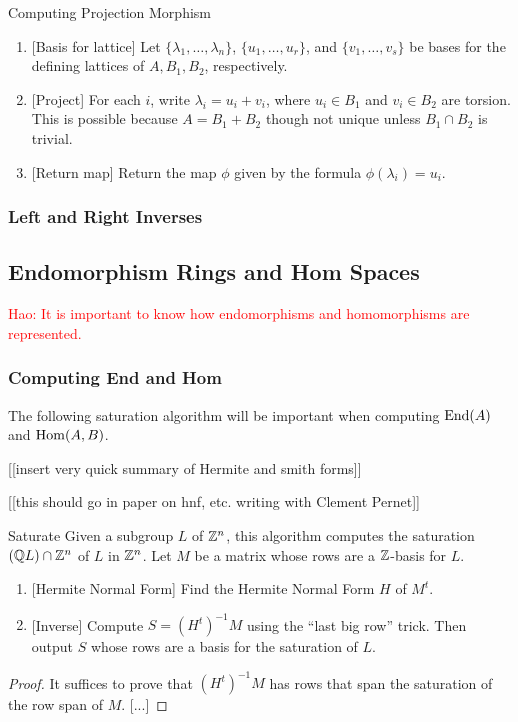 \documentclass{article}
\newcommand{\Haonew}[1]{\textcolor{red}{\textsf{Hao: #1}}}
\begin{document}
\begin{algorithm}{Computing Projection Morphism}
    \begin{enumerate}
        \item{} [Basis for lattice]
            Let $\{\lambda_1,\ldots,\lambda_n\}$, $\{u_1,\ldots,u_r\}$, and
            $\{v_1,\ldots,v_s\}$ be bases for the defining lattices of $A, B_1,
            B_2$, respectively.
        \item{} [Project]
            For each $i$, write $\lambda_i=u_i+v_i$, where $u_i\in B_1$ and
            $v_i\in B_2$ are torsion. This is possible because $A=B_1+B_2$
            though not unique unless $B_1\cap B_2$ is trivial.
        \item{} [Return map]
            Return the map $\phi$ given by the formula $\phi(\lambda_i)=u_i$.
    \end{enumerate}
\end{algorithm}

\subsubsection{Left and Right Inverses}

\subsection{Endomorphism Rings and Hom Spaces}

\Haonew{It is important to know how endomorphisms
and homomorphisms are represented.}

\subsubsection{Computing End and Hom}

The following saturation algorithm will be important
when computing $\operatorname{End}(A)$ and $\operatorname{Hom}(A,B)$.

[[insert very quick summary of Hermite and smith forms]]

[[this should go in paper on hnf, etc. writing with
Clement Pernet]]

\begin{algorithm}{Saturate}
Given a subgroup $L$ of $\mathbb{Z}^n$, this algorithm computes
the saturation $(\mathbb{Q} L) \cap \mathbb{Z}^n$ of $L$ in $\mathbb{Z}^n$.
Let $M$ be a matrix whose rows are a $\mathbb{Z}$-basis for $L$.

\begin{enumerate}
\item{} [Hermite Normal Form] Find the Hermite Normal Form $H$ of $M^t$.
\item{} [Inverse] Compute $S = (H^t)^{-1} M$ using the ``last big row'' trick.
Then output $S$ whose rows are a basis for the saturation of $L$.
\end{enumerate}
\end{algorithm}
\begin{proof}
It suffices to prove that $(H^t)^{-1}M$ has rows that span the
saturation of the row span of $M$.
[...]
\end{proof}
\end{document}
